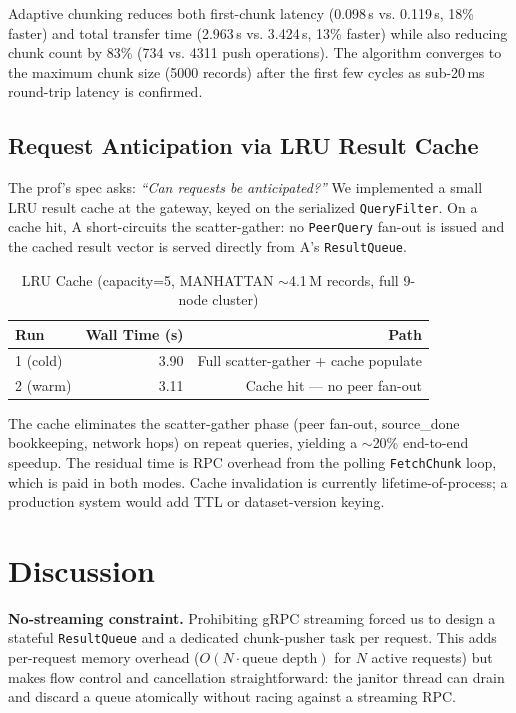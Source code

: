 \documentclass[conference]{IEEEtran}
\begin{document}
Adaptive chunking reduces both first-chunk latency (0.098\,s vs. 0.119\,s,
18\% faster) and total transfer time (2.963\,s vs. 3.424\,s, 13\% faster)
while also reducing chunk count by 83\% (734 vs. 4311 push operations). The
algorithm converges to the maximum chunk size (5000 records) after the first
few cycles as sub-20\,ms round-trip latency is confirmed.

\subsection{Request Anticipation via LRU Result Cache}
\label{sec:exp:cache}

The prof's spec asks: \emph{``Can requests be anticipated?''} We implemented
a small LRU result cache at the gateway, keyed on the serialized
\texttt{QueryFilter}. On a cache hit, A short-circuits the scatter-gather:
no \texttt{PeerQuery} fan-out is issued and the cached result vector is
served directly from A's \texttt{ResultQueue}.

\begin{table}[h]
\centering
\caption{LRU Cache (capacity=5, MANHATTAN $\sim$4.1\,M records, full 9-node cluster)}
\label{tab:cache}
\begin{tabular}{lrr}
\toprule
Run & Wall Time (s) & Path \\
\midrule
1 (cold) & 3.90 & Full scatter-gather + cache populate \\
2 (warm) & 3.11 & Cache hit — no peer fan-out \\
\bottomrule
\end{tabular}
\end{table}

The cache eliminates the scatter-gather phase (peer fan-out, source\_done
bookkeeping, network hops) on repeat queries, yielding a $\sim$20\%
end-to-end speedup. The residual time is RPC overhead from the polling
\texttt{FetchChunk} loop, which is paid in both modes. Cache invalidation
is currently lifetime-of-process; a production system would add TTL or
dataset-version keying.

\section{Discussion}
\label{sec:discussion}

\textbf{No-streaming constraint.} Prohibiting gRPC streaming forced us to
design a stateful \texttt{ResultQueue} and a dedicated chunk-pusher task per
request. This adds per-request memory overhead ($O(N \cdot \text{queue depth})$
for $N$ active requests) but makes flow control and cancellation straightforward:
the janitor thread can drain and discard a queue atomically without racing
against a streaming RPC.
\end{document}
